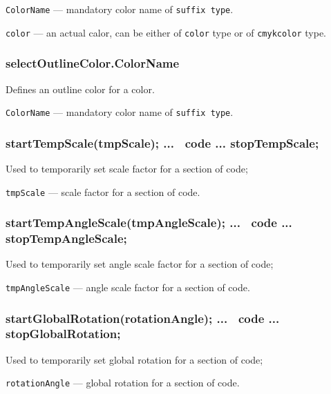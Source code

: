 \documentclass{ltxdoc}
\begin{document}
	\texttt{ColorName} — mandatory color name of \texttt{suffix type}.
	
	\texttt{color} — an actual calor, can be either of \texttt{color} type or of \texttt{cmykcolor} type.

\subsubsection{selectOutlineColor.ColorName}\label{selectOutlineColor}
	
	Defines an outline color for a color.

	\texttt{ColorName} — mandatory color name of \texttt{suffix type}.
	

\subsubsection{startTempScale(tmpScale); ... \METAPOST\ code ... stopTempScale;}\label{startTempScale}

	Used to temporarily set scale factor for a section of code;

	\texttt{tmpScale} — scale factor for a section of code.
		
\subsubsection{startTempAngleScale(tmpAngleScale); ... \METAPOST\ code ... stopTempAngleScale;}\label{startTempAngleScale}

	Used to temporarily set angle scale factor for a section of code;

	\texttt{tmpAngleScale} — angle scale factor for a section of code.

\subsubsection{startGlobalRotation(rotationAngle); ... \METAPOST\ code ... stopGlobalRotation;}\label{startGlobalRotation}

	Used to temporarily set global rotation for a section of code;

	\texttt{rotationAngle} — global rotation for a section of code.
	


\end{document}
